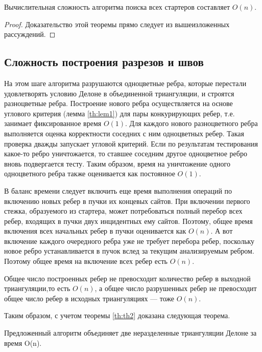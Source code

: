 \documentclass[12pt]{article}
\begin{document}
\begin{theorem}
\label{th:th2}
Вычислительная сложность алгоритма поиска всех стартеров составляет $O(n)$.
\end{theorem}

\begin{proof}
Доказательство этой теоремы прямо следует из вышеизложенных рассуждений.
\end{proof}

\subsection{Сложность построения разрезов и швов}
На этом шаге алгоритма разрушаются одноцветные ребра,
которые перестали удовлетворять условию Делоне в объединенной триангуляции,
и строятся разноцветные ребра.
Построение нового ребра осуществляется на основе углового критерия (лемма \ref{th:lem1}) для пары конкурирующих ребер,
т.е. занимает фиксированное время $O(1)$.
Для каждого нового разноцветного ребра выполняется оценка корректности соседних с ним одноцветных ребер.
Такая проверка дважды запускает угловой критерий.
Если по результатам тестирования какое-то ребро уничтожается, то ставшее соседним другое одноцветное ребро вновь подвергается тесту.
Таким образом, время на уничтожение одного одноцветного ребра также оценивается как постоянное $O(1)$.

В баланс времени следует включить еще время выполнения операций по включению новых ребер в пучки их концевых сайтов.
При включении первого стежка, образуемого из стартера, может потребоваться полный перебор всех ребер, входящих в пучки двух инцидентных ему сайтов. Поэтому, общее время включения всех начальных ребер в пучки оценивается как $O(n)$.
А вот включение каждого очередного ребра уже не требует перебора ребер,
поскольку новое ребро устанавливается в пучок вслед за текущим анализируемым ребром.
Поэтому общее время на включение всех ребер есть $O(n)$.

Общее число построенных ребер не превосходит количество ребер в выходной триангуляции,то есть $O(n)$,
а общее число разрушенных ребер не превосходит общее число ребер в исходных триангуляциях --- тоже $O(n)$.

Таким образом, с учетом теоремы \ref{th:th2} доказана следующая теорема.

\begin{theorem}
Предложенный алгоритм объединяет две неразделенные триангуляции Делоне за время O(n).
\end{theorem}
\end{document}
